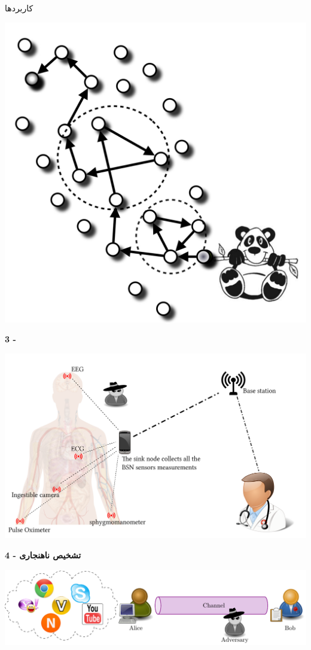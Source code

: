 \documentclass[debug,a0paper,portrait,persian]{xebaposter}
\begin{document}
\begin{poster}
\begin{posterbox}[name=phase2,column=1,span=1]{کاربردها}
\centerline{\includegraphics[width=\linewidth]{images/panda2}}

\textbf{3 - }

\centerline{\includegraphics[width=\linewidth]{images/WBAN}}

\textbf{4 - تشخیص ناهنجاری} 

  \centerline{\includegraphics[width=\linewidth]{images/AliceOperatorBobExt}}


\end{posterbox}
\end{poster}
\end{document}
